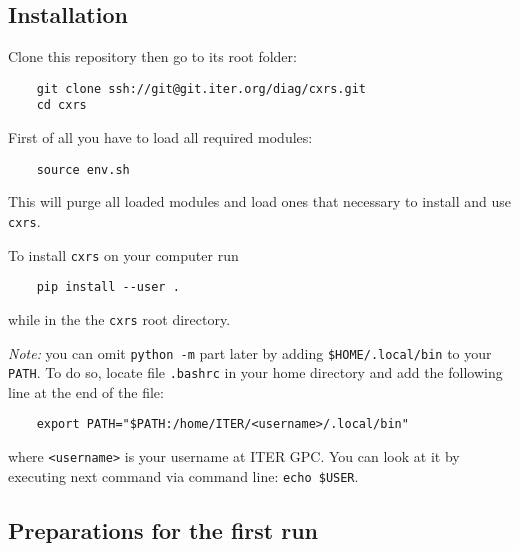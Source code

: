 \documentclass[../main.tex]{subfiles}
\begin{document}
\subsection{Installation}

Clone this repository then go to its root folder:

\begin{verbatim}
    git clone ssh://git@git.iter.org/diag/cxrs.git
    cd cxrs
\end{verbatim}

First of all you have to load all required modules:

\begin{verbatim}
    source env.sh
\end{verbatim}

This will purge all loaded modules and load ones that necessary to install and use \texttt{cxrs}.

To install \texttt{cxrs} on your computer run

\begin{verbatim}
    pip install --user .
\end{verbatim}

while in the the \texttt{cxrs} root directory.

\emph{Note:} you can omit \texttt{python -m} part later by adding \texttt{\$HOME/.local/bin} to your \texttt{PATH}. To do so, locate file \texttt{.bashrc} in your home directory and add the following line at the end of the file:

\begin{verbatim}
    export PATH="$PATH:/home/ITER/<username>/.local/bin"
\end{verbatim}

where \texttt{<username>} is your username at ITER GPC. You can look at it by executing next command via command line: \texttt{echo \$USER}.

\subsection{Preparations for the first run}
\end{document}
